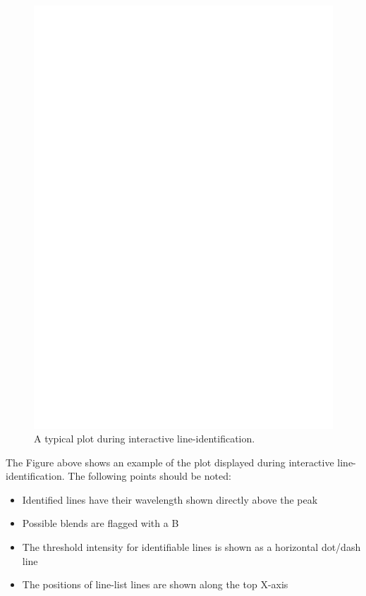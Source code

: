 \documentclass[11pt,twoside]{article}
\newcommand{\sunspec}[2]{#1}
\renewcommand{\sunspec}[2]{#2}
\begin{document}
\begin{figure}
\begin{center}
\includegraphics[width=\textwidth]{sun152_06.eps}

\parbox{140mm}{
\caption{A typical plot during interactive line-identification.}
\label{fi_idline}
}
\end{center}
\end{figure}

\sunspec{Figure~\ref{fi_idline}}{The Figure above}
shows an example of the plot displayed during interactive line-identification.
The following points should be noted:

\begin{itemize}
\item Identified lines have their wavelength shown directly above the peak
\item Possible blends are flagged with a B
\item The threshold intensity for identifiable lines is shown as a horizontal
dot/dash line
\item The positions of line-list lines are shown along the top X-axis
\end{itemize}
\end{document}
